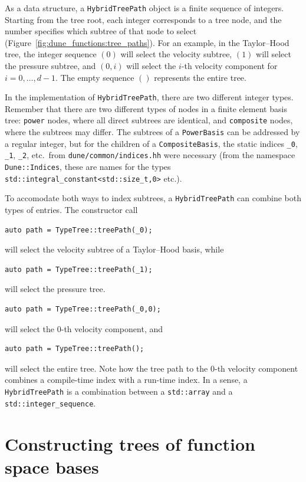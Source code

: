 \documentclass[a4paper,10pt,headings=normal,bibliography=totoc]{scrartcl}
\newcommand{\cpp}[1]{\lstinline[basicstyle=\ttfamily]!#1!}
\newcommand{\file}[1]{\texttt{#1}}
\begin{document}
As a data structure, a \cpp{HybridTreePath} object is a finite sequence of integers.
Starting from the tree root, each integer corresponds to a tree node, and the number specifies which
subtree of that node to select (Figure~\ref{fig:dune_functions:tree_paths}).
For an example, in the Taylor--Hood tree, the integer sequence $(0)$ will select the velocity subtree,
$(1)$ will select the pressure subtree, and $(0,i)$ will select the $i$-th velocity component for $i=0,\dots,d-1$.
The empty sequence $()$ represents the entire tree.

In the implementation of \cpp{HybridTreePath}, there are two different integer types.  Remember that there are
two different types of nodes in a finite element basis tree: \cpp{power} nodes, where all direct subtrees
are identical, and \cpp{composite} nodes, where the subtrees may differ.
The subtrees of a \cpp{PowerBasis} can be addressed by a regular integer,
but for the children of a \cpp{CompositeBasis}, the static indices \cpp{_0}, \cpp{_1}, \cpp{_2}, etc.\
from \file{dune/common/indices.hh} were necessary (from the namespace \cpp{Dune::Indices}, these are names
for the types \cpp{std::integral_constant<std::size_t,0>} etc.).

To accomodate both ways to index subtrees, a \cpp{HybridTreePath} can combine both types of entries.
The constructor call
\begin{lstlisting}
auto path = TypeTree::treePath(_0);
\end{lstlisting}
will select the velocity subtree of a Taylor--Hood basis, while
\begin{lstlisting}
auto path = TypeTree::treePath(_1);
\end{lstlisting}
will select the pressure tree.
\begin{lstlisting}
auto path = TypeTree::treePath(_0,0);
\end{lstlisting}
will select the $0$-th velocity component, and
\begin{lstlisting}
auto path = TypeTree::treePath();
\end{lstlisting}
will select the entire tree.  Note how the tree path to the $0$-th velocity component combines a compile-time
index with a run-time index.  In a sense, a \cpp{HybridTreePath} is a combination between a \cpp{std::array}
and a \cpp{std::integer_sequence}.







\section{Constructing trees of function space bases}
\end{document}
